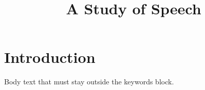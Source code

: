 \documentclass{article}
\title{A Study of Speech}
\begin{document}
\maketitle
{}
\section{Introduction}
Body text that must stay outside the keywords block.
\end{document}
